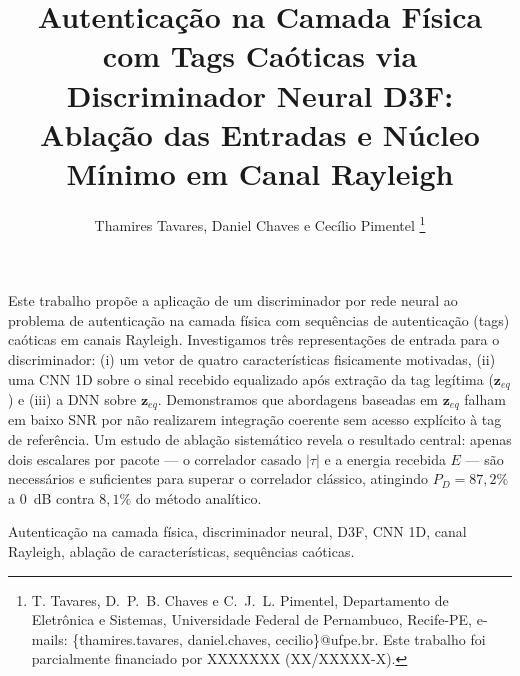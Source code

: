 \documentclass{sbrt}
\begin{document}
\title{Autenticação na Camada Física com Tags Caóticas via Discriminador Neural D3F: Ablação das Entradas e Núcleo Mínimo em Canal Rayleigh}

\author{Thamires Tavares, Daniel Chaves e Cecílio Pimentel
\thanks{T. Tavares, D.~P.~B. Chaves e C.~J.~L. Pimentel, Departamento de Eletrônica e Sistemas, Universidade Federal de Pernambuco, Recife-PE, e-mails: \{thamires.tavares, daniel.chaves, cecilio\}@ufpe.br. Este trabalho foi parcialmente financiado por XXXXXXX (XX/XXXXX-X).}%
}

\maketitle



\begin{resumo}
Este trabalho propõe a aplicação de um discriminador por rede neural ao problema de autenticação na camada física com sequências de autenticação (tags) caóticas em canais Rayleigh. Investigamos três representações de entrada para o discriminador: (i) um vetor de quatro características fisicamente motivadas, (ii) uma CNN 1D sobre o sinal recebido equalizado após extração da tag legítima ($\mathbf{z}_{eq}$) e (iii) a DNN sobre $\mathbf{z}_{eq}$. Demonstramos que abordagens baseadas em $\mathbf{z}_{eq}$ falham em baixo SNR por não realizarem integração coerente sem acesso explícito à tag de referência. Um estudo de ablação sistemático revela o resultado central: apenas dois escalares por pacote — o correlador casado $|\tau|$ e a energia recebida $E$ — são necessários e suficientes para superar o correlador clássico, atingindo $P_D = 87{,}2\%$ a 0~dB contra $8{,}1\%$ do método analítico.
\end{resumo}
\begin{chave}
Autenticação na camada física, discriminador neural, D3F, CNN 1D, canal Rayleigh, ablação de características, sequências caóticas.
\end{chave}
\end{document}
